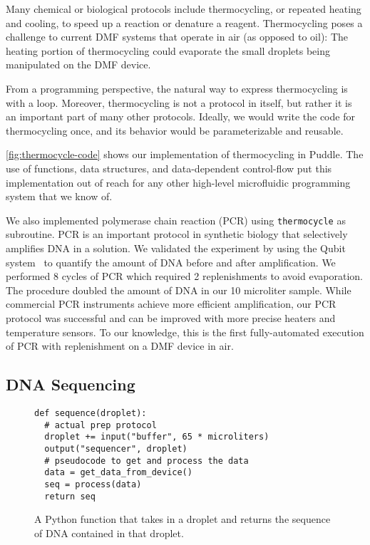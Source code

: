 \documentclass{jpaper}
\begin{document}
Many chemical or biological protocols include thermocycling, or repeated heating and cooling, to speed up a reaction or denature a reagent.
Thermocycling poses a challenge to current DMF systems that operate in air (as opposed to oil):
The heating portion of thermocycling could evaporate the small droplets being manipulated on the DMF device.

From a programming perspective, the natural way to express thermocycling is with a loop.
Moreover, thermocycling is not a protocol in itself, but rather it is an important part of many other protocols.
Ideally, we would write the code for thermocycling once, and its behavior would be parameterizable and reusable.

\autoref{fig:thermocycle-code} shows our implementation of thermocycling in Puddle.
The use of functions, data structures, and data-dependent control-flow put this implementation out of reach for any other high-level microfluidic programming system that we know of.

We also implemented polymerase chain reaction (PCR) using \lstinline{thermocycle} as subroutine.
PCR is an important protocol in synthetic biology that selectively amplifies DNA in a solution.
We validated the experiment by using the Qubit system~\cite{qubit} to quantify the amount of DNA before and after amplification.
We performed 8 cycles of PCR which required 2 replenishments to avoid evaporation.
The procedure doubled the amount of DNA in our 10 microliter sample.
While commercial PCR instruments achieve more efficient amplification, our PCR protocol was successful and can be improved with more precise heaters and temperature sensors.
To our knowledge, this is the first fully-automated execution of PCR with replenishment on a DMF device in air.


\subsection{DNA Sequencing}
\label{sec:nanopore}

\begin{figure}
\begin{lstlisting}[basicstyle=\footnotesize\ttfamily]
def sequence(droplet):
  # actual prep protocol
  droplet += input("buffer", 65 * microliters)
  output("sequencer", droplet)
  # pseudocode to get and process the data
  data = get_data_from_device()
  seq = process(data)
  return seq
\end{lstlisting}
  \caption{
    A Python function that takes in a droplet and returns the sequence of DNA contained in that droplet.
  }
  \label{fig:nanopore-code}
\end{figure}
\end{document}
